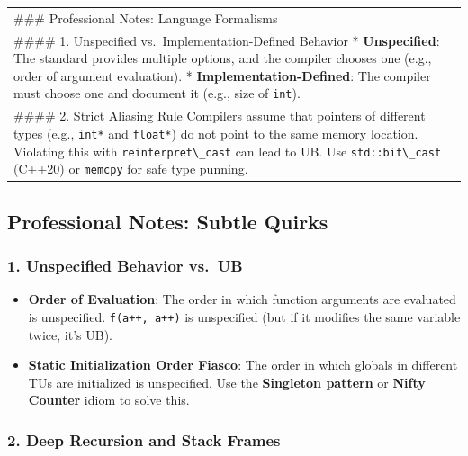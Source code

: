 \begin{longtable}[]{@{}
  >{\raggedright\arraybackslash}p{}@{}}
\toprule
\endhead
\#\#\# Professional Notes: Language Formalisms \\
\#\#\#\# 1. Unspecified vs.~Implementation-Defined Behavior *
\textbf{Unspecified}: The standard provides multiple options, and the
compiler chooses one (e.g., order of argument evaluation). *
\textbf{Implementation-Defined}: The compiler must choose one and
document it (e.g., size of \passthrough{\lstinline!int!}). \\
\#\#\#\# 2. Strict Aliasing Rule Compilers assume that pointers of
different types (e.g., \passthrough{\lstinline!int*!} and
\passthrough{\lstinline!float*!}) do not point to the same memory
location. Violating this with
\passthrough{\lstinline!reinterpret\_cast!} can lead to UB. Use
\passthrough{\lstinline!std::bit\_cast!} (C++20) or
\passthrough{\lstinline!memcpy!} for safe type punning. \\
\bottomrule
\end{longtable}

\hypertarget{professional-notes-subtle-quirks}{%
\subsection{Professional Notes: Subtle
Quirks}\label{professional-notes-subtle-quirks}}

\hypertarget{unspecified-behavior-vs.-ub}{%
\subsubsection{1. Unspecified Behavior
vs.~UB}\label{unspecified-behavior-vs.-ub}}

\begin{itemize}
\tightlist
\item
  \textbf{Order of Evaluation}: The order in which function arguments
  are evaluated is unspecified. \passthrough{\lstinline!f(a++, a++)!} is
  unspecified (but if it modifies the same variable twice, it's UB).
\item
  \textbf{Static Initialization Order Fiasco}: The order in which
  globals in different TUs are initialized is unspecified. Use the
  \textbf{Singleton pattern} or \textbf{Nifty Counter} idiom to solve
  this.
\end{itemize}

\hypertarget{deep-recursion-and-stack-frames}{%
\subsubsection{2. Deep Recursion and Stack
Frames}\label{deep-recursion-and-stack-frames}}

